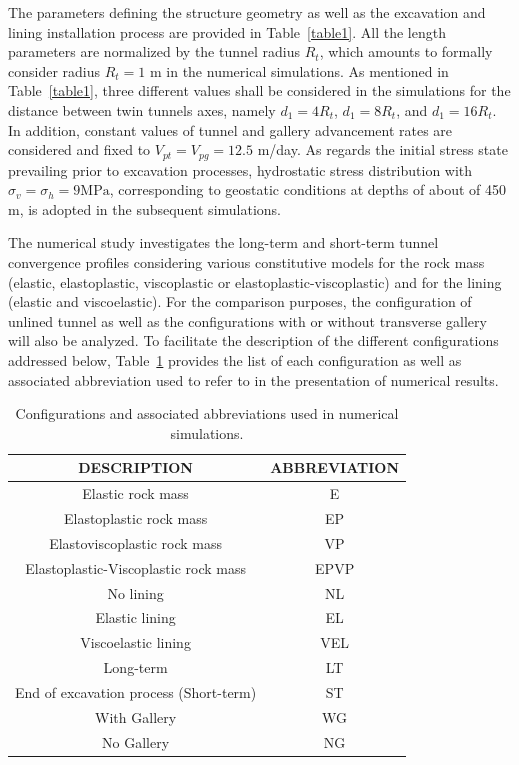 \documentclass[a4paper,fleqn]{cas-sc}
\begin{document}
The parameters defining the structure geometry as well as the excavation and lining installation process are provided in Table~\ref{table1}. All the length parameters are normalized by the tunnel radius $R_t$, which amounts to formally consider radius $R_t=1$ m in the numerical simulations. As mentioned in Table~\ref{table1}, three different values shall be considered in the simulations for the distance between twin tunnels axes, namely $d_1=4R_t$, $d_1=8R_t$, and $d_1=16R_t$. In addition, constant values of tunnel and gallery advancement rates are considered and fixed to $V_{pt} = V_{pg} = 12.5$ m/day. As regards the initial stress state prevailing prior to excavation processes, hydrostatic stress distribution with $\sigma_v=\sigma_h=9 \text{MPa}$, corresponding to geostatic conditions at depths of about of 450 m, is adopted in the subsequent simulations.

The numerical study investigates the long-term and short-term tunnel convergence profiles considering various constitutive models for the rock mass (elastic, elastoplastic, viscoplastic or elastoplastic-viscoplastic) and for the lining (elastic and viscoelastic). For the comparison purposes, the configuration of unlined tunnel as well as the configurations with or without transverse gallery will also be analyzed. To facilitate the description of the different configurations addressed below, Table~\ref{table3} provides the list of each configuration as well as associated abbreviation used to refer to in the presentation of numerical results.

\FloatBarrier
\begin{table}[h!]
	\caption{Configurations and associated abbreviations used in numerical simulations.}
	\label{table3}
	\centering
	\renewcommand{\arraystretch}{1.25}
	\begin{tabular}{c c}
		\hline
		\multicolumn{1}{c}{DESCRIPTION} &
		\multicolumn{1}{c}{ABBREVIATION} \\
		\hline
		Elastic rock mass & E \\
		Elastoplastic rock mass & EP \\
		Elastoviscoplastic rock mass & VP \\
		Elastoplastic-Viscoplastic rock mass & EPVP \\
		No lining & NL \\
		Elastic lining & EL \\
		Viscoelastic lining & VEL \\
		Long-term & LT \\
		End of excavation process (Short-term) & ST \\
		With Gallery & WG \\
		No Gallery & NG \\			
		\hline
	\end{tabular}
	\normalsize
\end{table}
\FloatBarrier
\end{document}
